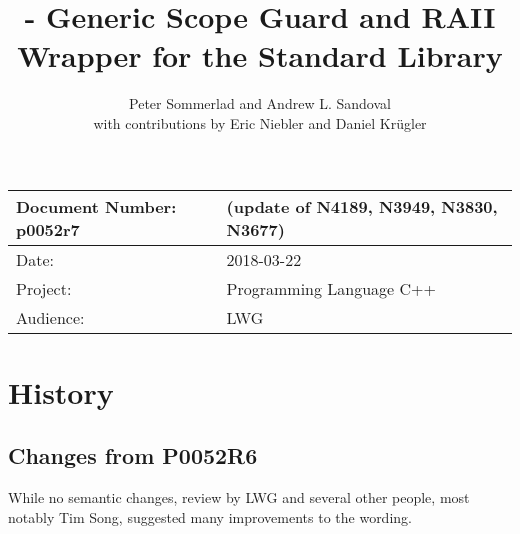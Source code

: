 \documentclass[ebook,11pt,article]{memoir}
\title{\papernumber{} - Generic Scope Guard and RAII Wrapper for the Standard Library}
\author{Peter Sommerlad and Andrew L. Sandoval\\with contributions by Eric Niebler and Daniel Kr\"ugler}
\date{\paperdate}                        %
\newcommand{\papernumber}{p0052r7}
\newcommand{\paperdate}{2018-03-22}
\begin{document}
\maketitle
\begin{tabular}[t]{|l|l|}\hline 
Document Number: \papernumber &   (update of N4189, N3949, N3830, N3677)\\\hline
Date: & \paperdate \\\hline
Project: & Programming Language C++\\\hline 
Audience: & LWG\\\hline
\end{tabular}

\chapter{History}
\section{Changes from P0052R6}
While no semantic changes, review by LWG and several other people, most notably Tim Song, suggested many improvements to the wording.
\end{document}

